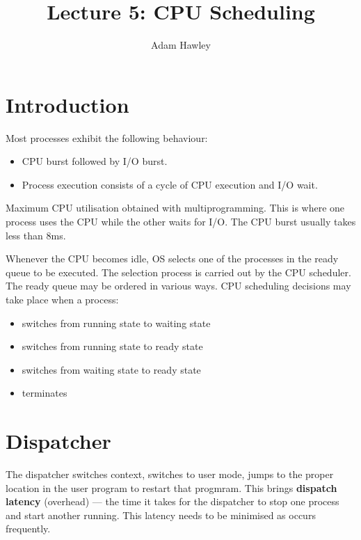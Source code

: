 \documentclass{article}
\title{Lecture 5: CPU Scheduling}
\author{Adam Hawley}
\begin{document}
\maketitle
\tableofcontents
\newpage

\section{Introduction}
Most processes exhibit the following behaviour:
\begin{itemize}
	\item CPU burst followed by I/O burst.
	\item Process execution consists of a cycle of CPU execution and I/O wait.
\end{itemize}
Maximum CPU utilisation obtained with multiprogramming.
This is where one process uses the CPU while the other waits for I/O.
The CPU burst usually takes less than 8ms.

Whenever the CPU becomes idle, OS selects one of the processes in the ready queue to be executed.
The selection process is carried out by the CPU scheduler.
The ready queue may be ordered in various ways.
CPU scheduling decisions may take place when a process:
\begin{itemize}
	\item switches from running state to waiting state
	\item switches from running state to ready state
	\item switches from waiting state to ready state
	\item terminates
\end{itemize}

\section{Dispatcher}
The dispatcher switches context, switches to user mode, jumps to the proper location in the user program to restart that progmram.
This brings \textbf{dispatch latency} (overhead) --- the time it takes for the dispatcher to stop one process and start another running.
This latency needs to be minimised as occurs frequently.
\end{document}
